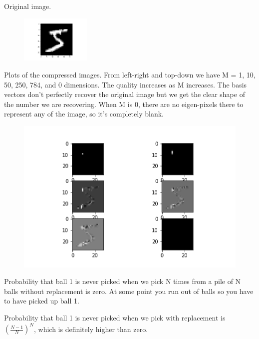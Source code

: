 \documentclass[newpage]{homework}
\begin{document}
\newpage
Original image. 
\begin{figure}[htbp]
    \centering
    \includegraphics[width=0.3\textwidth]{3c-og.png}
\end{figure}

Plots of the compressed images. From left-right and top-down we have M = 1, 10, 50, 250, 784, and 0 dimensions. The quality increases as M increases. The basis vectors don't perfectly recover the original image but we get the clear shape of the number we are recovering. When M is 0, there are no eigen-pixels there to represent any of the image, so it's completely blank.
\begin{figure}[htbp]
    \centering
    \includegraphics[width=\textwidth]{3c-compress.png}
\end{figure}


\question
Probability that ball 1 is never picked when we pick N times from a pile of N balls without replacement is zero. At some point you run out of balls so you have to have picked up ball 1.

Probability that ball 1 is never picked when we pick with replacement is $\left(\frac{N-1}{N}\right)^N$, which is definitely higher than zero.
\end{document}
